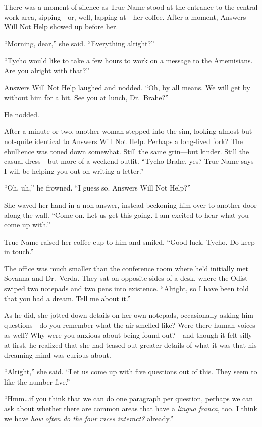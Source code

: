 There was a moment of silence as True Name stood at the entrance to the central work area, sipping—or, well, lapping at—her coffee. After a moment, Answers Will Not Help showed up before her.

``Morning, dear,'' she said. ``Everything alright?''

``Tycho would like to take a few hours to work on a message to the Artemisians. Are you alright with that?''

Answers Will Not Help laughed and nodded. ``Oh, by all means. We will get by without him for a bit. See you at lunch, Dr.~Brahe?''

He nodded.

After a minute or two, another woman stepped into the sim, looking almost-but-not-quite identical to Answers Will Not Help. Perhaps a long-lived fork? The ebullience was toned down somewhat. Still the same grin—but kinder. Still the casual dress—but more of a weekend outfit. ``Tycho Brahe, yes? True Name says I will be helping you out on writing a letter.''

``Oh, uh,'' he frowned. ``I guess so. Answers Will Not Help?''

She waved her hand in a non-answer, instead beckoning him over to another door along the wall. ``Come on. Let us get this going. I am excited to hear what you come up with.''

True Name raised her coffee cup to him and smiled. ``Good luck, Tycho. Do keep in touch.''

The office was much smaller than the conference room where he'd initially met Sovanna and Dr.~Verda. They sat on opposite sides of a desk, where the Odist swiped two notepads and two pens into existence. ``Alright, so I have been told that you had a dream. Tell me about it.''

As he did, she jotted down details on her own notepads, occasionally asking him questions—do you remember what the air smelled like? Were there human voices as well? Why were you anxious about being found out?—and though it felt silly at first, he realized that she had teased out greater details of what it was that his dreaming mind was curious about.

``Alright,'' she said. ``Let us come up with five questions out of this. They seem to like the number five.''

``Hmm\ldots{}if you think that we can do one paragraph per question, perhaps we can ask about whether there are common areas that have a \emph{lingua franca}, too. I think we have \emph{how often do the four races interact?} already.''

